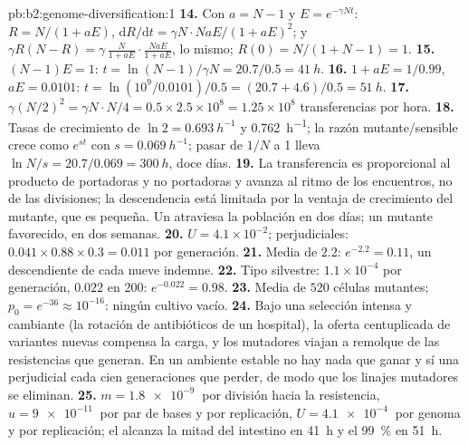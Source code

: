 \begin{solution}{pb:b2:genome-diversification:1}
\textbf{14.} Con $a = N - 1$ y $E = e^{-\gamma Nt}$: $R = N/(1 +
aE)$, $\mathrm{d}R/\mathrm{d}t = \gamma N\cdot NaE/(1 + aE)^2$; y
$\gamma R(N - R) = \gamma\,\frac{N}{1 + aE}\cdot\frac{NaE}{1 + aE}$,
lo mismo; $R(0) = N/(1 + N - 1) = 1$.
\textbf{15.} $(N - 1)E = 1$: $t = \ln(N - 1)/\gamma N = 20.7/0.5 =
\qty{41}{h}$.
\textbf{16.} $1 + aE = 1/0.99$, $aE = 0.0101$: $t = \ln(10^{9}/0.0101)
/0.5 = (20.7 + 4.6)/0.5 = \qty{51}{h}$.
\textbf{17.} $\gamma (N/2)^2 = \gamma N\cdot N/4 = 0.5\times 2.5\times
10^{8} = 1.25\times 10^{8}$ transferencias por hora.
\textbf{18.} Tasas de crecimiento de $\ln 2 = \qty{0.693}{h^{-1}}$ y
\qty{0.762}{h^{-1}}; la razón mutante/sensible crece como $e^{st}$
con $s = \qty{0.069}{h^{-1}}$; pasar de $1/N$ a 1 lleva $\ln N/s =
20.7/0.069 = \qty{300}{h}$, doce días.
\textbf{19.} La transferencia es proporcional al producto de portadoras y
no portadoras y avanza al ritmo de los encuentros, no de las divisiones;
la descendencia está limitada por la ventaja de crecimiento del mutante,
que es pequeña. Un  atraviesa la población en dos días; un
mutante favorecido, en dos semanas.
\textbf{20.} $U = 4.1\times 10^{-2}$; perjudiciales: $0.041\times 0.88\times
0.3 = 0.011$ por generación.
\textbf{21.} Media de $2.2$: $e^{-2.2} = 0.11$, un descendiente de cada
nueve indemne.
\textbf{22.} Tipo silvestre: $1.1\times 10^{-4}$ por generación, $0.022$ en
200: $e^{-0.022} = 0.98$.
\textbf{23.} Media de $520$ células mutantes; $p_0 = e^{-36} \approx
10^{-16}$: ningún cultivo vacío.
\textbf{24.} Bajo una selección intensa y cambiante (la rotación de
antibióticos de un hospital), la oferta centuplicada de variantes nuevas
compensa la carga, y los mutadores viajan a remolque de las resistencias
que generan. En un ambiente estable no hay nada que ganar y sí una
 perjudicial cada cien generaciones que perder, de modo que los
linajes mutadores se eliminan.
\textbf{25.} $m = \qty{1.8e-9}{}$ por división hacia la resistencia, $u =
\qty{9e-11}{}$ por par de bases y por replicación, $U = \qty{4.1e-4}{}$
 por genoma y por replicación; el  alcanza la mitad del
intestino en \qty{41}{h} y el \qty{99}{\%} en \qty{51}{h}.
\end{solution}
